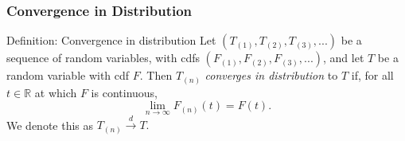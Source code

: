 \documentclass[12pt, block=fill]{beamer}
\newcommand{\R}{\mathbb{R}}
\newcommand{\paul}[1]{{\color{red}#1}}
\begin{document}
\begin{frame}
  \frametitle{Convergence in Distribution}
  
  \begin{block}{Definition: Convergence in distribution}
  Let $(T_{(1)}, T_{(2)}, T_{(3)}, ...)$ be a sequence of random variables, with cdfs  $(F_{(1)}, F_{(2)}, F_{(3)}, ...)$, and let $T$ be a random variable with cdf $F$.  Then $T_{(n)}$ \textit{converges in distribution} to $T$ if, for all $t\in \R$ at which $F$ is continuous,
  $$\lim_{n \rightarrow \infty} F_{(n)} (t) = F(t).$$
  We denote this as $T_{(n)} \overset{d}{\rightarrow} T.$ 
  \end{block}
\end{frame} 

\end{document}
